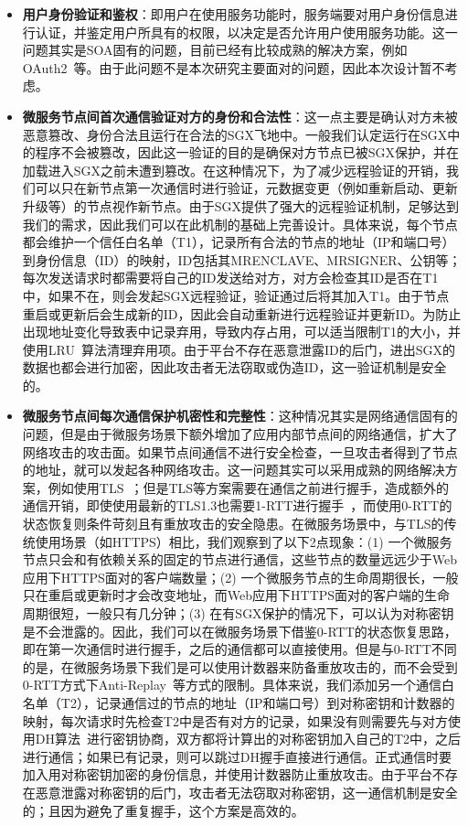 \begin{itemize}
    \item \textbf{用户身份验证和鉴权}：即用户在使用服务功能时，服务端要对用户身份信息进行认证，并鉴定用户所具有的权限，以决定是否允许用户使用服务功能。这一问题其实是SOA固有的问题，目前已经有比较成熟的解决方案，例如OAuth2~\cite{}等。由于此问题不是本次研究主要面对的问题，因此本次设计暂不考虑。
    \item \textbf{微服务节点间首次通信验证对方的身份和合法性}：这一点主要是确认对方未被恶意篡改、身份合法且运行在合法的SGX飞地中。一般我们认定运行在SGX中的程序不会被篡改，因此这一验证的目的是确保对方节点已被SGX保护，并在加载进入SGX之前未遭到篡改。在这种情况下，为了减少远程验证的开销，我们可以只在新节点第一次通信时进行验证，元数据变更（例如重新启动、更新升级等）的节点视作新节点。由于SGX提供了强大的远程验证机制，足够达到我们的需求，因此我们可以在此机制的基础上完善设计。具体来说，每个节点都会维护一个信任白名单（T1），记录所有合法的节点的地址（IP和端口号）到身份信息（ID）的映射，ID包括其MRENCLAVE、MRSIGNER、公钥等；每次发送请求时都需要将自己的ID发送给对方，对方会检查其ID是否在T1中，如果不在，则会发起SGX远程验证，验证通过后将其加入T1。由于节点重启或更新后会生成新的ID，因此会自动重新进行远程验证并更新ID。为防止出现地址变化导致表中记录弃用，导致内存占用，可以适当限制T1的大小，并使用LRU~\cite{}算法清理弃用项。由于平台不存在恶意泄露ID的后门，进出SGX的数据也都会进行加密，因此攻击者无法窃取或伪造ID，这一验证机制是安全的。%
    \item \textbf{微服务节点间每次通信保护机密性和完整性}：这种情况其实是网络通信固有的问题，但是由于微服务场景下额外增加了应用内部节点间的网络通信，扩大了网络攻击的攻击面。如果节点间通信不进行安全检查，一旦攻击者得到了节点的地址，就可以发起各种网络攻击。这一问题其实可以采用成熟的网络解决方案，例如使用TLS~\cite{}；但是TLS等方案需要在通信之前进行握手，造成额外的通信开销，即使使用最新的TLS1.3也需要1-RTT进行握手~\cite{}，而使用0-RTT的状态恢复则条件苛刻且有重放攻击的安全隐患。在微服务场景中，与TLS的传统使用场景（如HTTPS）相比，我们观察到了以下2点现象：(1) 一个微服务节点只会和有依赖关系的固定的节点进行通信，这些节点的数量远远少于Web应用下HTTPS面对的客户端数量；(2) 一个微服务节点的生命周期很长，一般只在重启或更新时才会改变地址，而Web应用下HTTPS面对的客户端的生命周期很短，一般只有几分钟；(3) 在有SGX保护的情况下，可以认为对称密钥是不会泄露的。因此，我们可以在微服务场景下借鉴0-RTT的状态恢复思路，即在第一次通信时进行握手，之后的通信都可以直接使用。但是与0-RTT不同的是，在微服务场景下我们是可以使用计数器来防备重放攻击的，而不会受到0-RTT方式下Anti-Replay~\cite{}等方式的限制。具体来说，我们添加另一个通信白名单（T2），记录通信过的节点的地址（IP和端口号）到对称密钥和计数器的映射，每次请求时先检查T2中是否有对方的记录，如果没有则需要先与对方使用DH算法~\cite{}进行密钥协商，双方都将计算出的对称密钥加入自己的T2中，之后进行通信；如果已有记录，则可以跳过DH握手直接进行通信。正式通信时要加入用对称密钥加密的身份信息，并使用计数器防止重放攻击。由于平台不存在恶意泄露对称密钥的后门，攻击者无法窃取对称密钥，这一通信机制是安全的；且因为避免了重复握手，这个方案是高效的。

\end{itemize}
